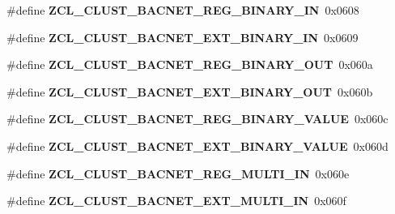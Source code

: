 \begin{DoxyCompactItemize}
\item 
\hypertarget{group__zcl_ga1656ef8cb0ffed118cc274fa7c8e8496}{\#define {\bfseries Z\-C\-L\-\_\-\-C\-L\-U\-S\-T\-\_\-\-B\-A\-C\-N\-E\-T\-\_\-\-R\-E\-G\-\_\-\-B\-I\-N\-A\-R\-Y\-\_\-\-I\-N}~0x0608}\label{group__zcl_ga1656ef8cb0ffed118cc274fa7c8e8496}

\item 
\hypertarget{group__zcl_gab909a7fc228d6e171a73a448d46859f5}{\#define {\bfseries Z\-C\-L\-\_\-\-C\-L\-U\-S\-T\-\_\-\-B\-A\-C\-N\-E\-T\-\_\-\-E\-X\-T\-\_\-\-B\-I\-N\-A\-R\-Y\-\_\-\-I\-N}~0x0609}\label{group__zcl_gab909a7fc228d6e171a73a448d46859f5}

\item 
\hypertarget{group__zcl_gacd2257cf2c2ec6fef7b481191db3a1cf}{\#define {\bfseries Z\-C\-L\-\_\-\-C\-L\-U\-S\-T\-\_\-\-B\-A\-C\-N\-E\-T\-\_\-\-R\-E\-G\-\_\-\-B\-I\-N\-A\-R\-Y\-\_\-\-O\-U\-T}~0x060a}\label{group__zcl_gacd2257cf2c2ec6fef7b481191db3a1cf}

\item 
\hypertarget{group__zcl_ga79f225dbdd3ff8341b6f061e94a86e2d}{\#define {\bfseries Z\-C\-L\-\_\-\-C\-L\-U\-S\-T\-\_\-\-B\-A\-C\-N\-E\-T\-\_\-\-E\-X\-T\-\_\-\-B\-I\-N\-A\-R\-Y\-\_\-\-O\-U\-T}~0x060b}\label{group__zcl_ga79f225dbdd3ff8341b6f061e94a86e2d}

\item 
\hypertarget{group__zcl_gad5a654eccd9418893c386ae81cf4956f}{\#define {\bfseries Z\-C\-L\-\_\-\-C\-L\-U\-S\-T\-\_\-\-B\-A\-C\-N\-E\-T\-\_\-\-R\-E\-G\-\_\-\-B\-I\-N\-A\-R\-Y\-\_\-\-V\-A\-L\-U\-E}~0x060c}\label{group__zcl_gad5a654eccd9418893c386ae81cf4956f}

\item 
\hypertarget{group__zcl_ga56dcda150a30a66548abee50b40a3cb1}{\#define {\bfseries Z\-C\-L\-\_\-\-C\-L\-U\-S\-T\-\_\-\-B\-A\-C\-N\-E\-T\-\_\-\-E\-X\-T\-\_\-\-B\-I\-N\-A\-R\-Y\-\_\-\-V\-A\-L\-U\-E}~0x060d}\label{group__zcl_ga56dcda150a30a66548abee50b40a3cb1}

\item 
\hypertarget{group__zcl_ga019cd5f70e44a06efce061562ccc01a4}{\#define {\bfseries Z\-C\-L\-\_\-\-C\-L\-U\-S\-T\-\_\-\-B\-A\-C\-N\-E\-T\-\_\-\-R\-E\-G\-\_\-\-M\-U\-L\-T\-I\-\_\-\-I\-N}~0x060e}\label{group__zcl_ga019cd5f70e44a06efce061562ccc01a4}

\item 
\hypertarget{group__zcl_ga36f5e811622f3ead41a075688778dc95}{\#define {\bfseries Z\-C\-L\-\_\-\-C\-L\-U\-S\-T\-\_\-\-B\-A\-C\-N\-E\-T\-\_\-\-E\-X\-T\-\_\-\-M\-U\-L\-T\-I\-\_\-\-I\-N}~0x060f}\label{group__zcl_ga36f5e811622f3ead41a075688778dc95}


\end{DoxyCompactItemize}

